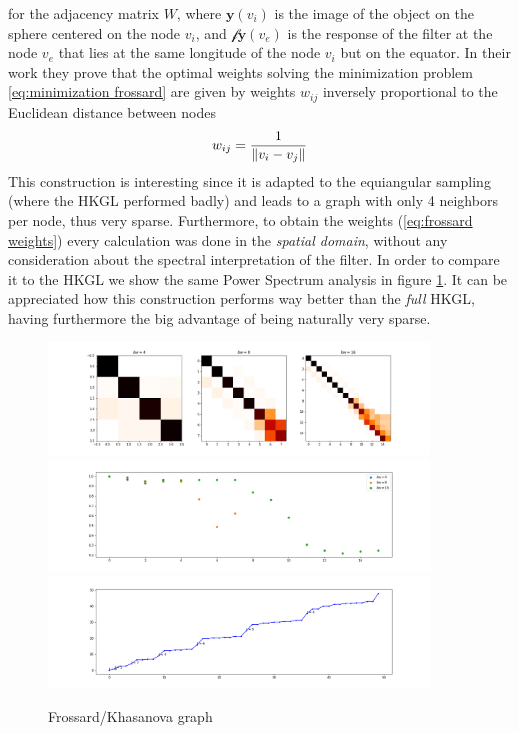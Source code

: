 for the adjacency matrix $W$, where $\mathbf y(v_i)$ is the image of the object on the sphere centered on the node $v_i$, and $\mathcal f\mathbf y(v_e)$ is the response of the filter at the node $v_e$ that lies at the same longitude of the node $v_i$ but on the equator. In their work they prove that the optimal weights solving the minimization problem \ref{eq:minimization frossard} are given by weights $w_{ij}$ inversely proportional to the Euclidean distance between nodes
\begin{equation}\label{eq:frossard weights}
	w_{ij} = \frac{1}{\left\lVert v_i-v_j\right\rVert}
\end{equation}
This construction is interesting since it is adapted to the equiangular sampling (where the HKGL performed badly) and leads to a graph with only 4 neighbors per node, thus very sparse. Furthermore, to obtain the weights (\ref{eq:frossard weights}) every calculation was done in the \textit{spatial domain}, without any consideration about the spectral interpretation of the filter. In order to compare it to the HKGL we show the same Power Spectrum analysis in figure \ref{fig:Frossard/Khasanova graph}. It can be appreciated how this construction performs way better than the \textit{full} HKGL, having furthermore the big advantage of being naturally very sparse.
\begin{figure}[h!]
	\centering
	\includegraphics[width=0.9\textwidth]{../codes/02.HeatKernelGraphLaplacian/equiangular/equi_Khasanova_Frossard_full.png}
	\includegraphics[width=0.9\textwidth]{../codes/02.HeatKernelGraphLaplacian/equiangular/equi_Khasanova_Frossard_full_diagonal.png}
	\includegraphics[width=0.9\textwidth]{../codes/02.HeatKernelGraphLaplacian/equiangular/equi_full_Khasanova_Frossard_eigenvalues_16.png}
	\caption{\label{fig:Frossard/Khasanova graph}Frossard/Khasanova graph}
\end{figure}

